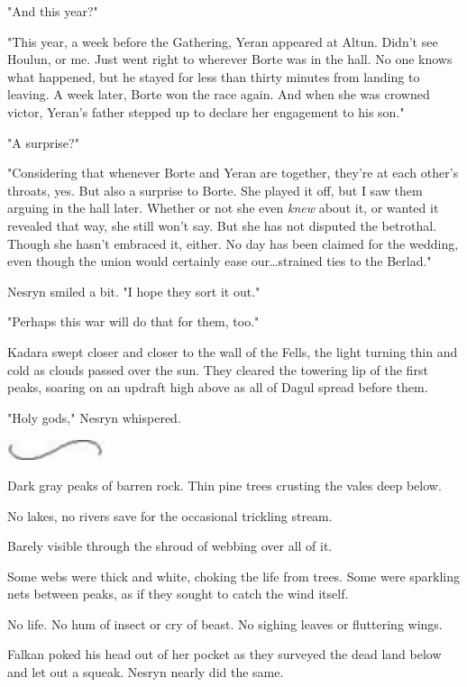 "And this year?"

"This year, a week before the Gathering, Yeran appeared at Altun.
Didn't see Houlun, or me.
Just went right to wherever Borte was in the hall.
No one knows what happened, but he stayed for less than thirty minutes from landing to leaving.
A week later, Borte won the race again.
And when she was crowned victor, Yeran's father stepped up to declare her engagement to his son."

"A surprise?"

"Considering that whenever Borte and Yeran are together, they're at each other's throats, yes.
But also a surprise to Borte.
She played it off, but I saw them arguing in the hall later.
Whether or not she even \emph{knew} about it, or wanted it revealed that way, she still won't say.
But she has not disputed the betrothal.
Though she hasn't embraced it, either.
No day has been claimed for the wedding, even though the union would certainly ease our\ldots strained ties to the Berlad."

Nesryn smiled a bit.
"I hope they sort it out."

"Perhaps this war will do that for them, too."

Kadara swept closer and closer to the wall of the Fells, the light turning thin and cold as clouds passed over the sun.
They cleared the towering lip of the first peaks, soaring on an updraft high above as all of Dagul spread before them.

"Holy gods," Nesryn whispered.

\begin{center}
	\includegraphics[width=1.12in,height=0.24in]{images/seperator}
\end{center}

Dark gray peaks of barren rock.
Thin pine trees crusting the vales deep below.

No lakes, no rivers save for the occasional trickling stream.

Barely visible through the shroud of webbing over all of it.

Some webs were thick and white, choking the life from trees.
Some were sparkling nets between peaks, as if they sought to catch the wind itself.

No life.
No hum of insect or cry of beast.
No sighing leaves or fluttering wings.

Falkan poked his head out of her pocket as they surveyed the dead land below and let out a squeak.
Nesryn nearly did the same.


